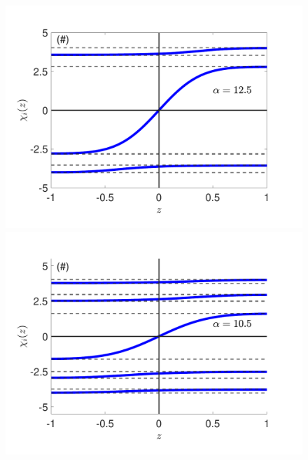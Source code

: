 \documentclass[prl,twocolumn,showpacs,preprintnumbers,amsmath,amssymb, superscriptaddress]{revtex4-2}
\newcommand{\1}{{1\hspace*{-0.5ex} \textrm{l} \hspace*{0.5ex}}}
\begin{document}
  	\begin{figure}[tbh!]
		\begin{center}
			\includegraphics[width=0.9\columnwidth]{SupMatFig_3Particle_Trajectory.pdf}
			\includegraphics[width=0.9\columnwidth]{SupMatFig_5Particle_Trajectory.pdf}
			\caption{  }
			\label{fig:gap}
		\end{center}
	\end{figure}
	
\end{document}
